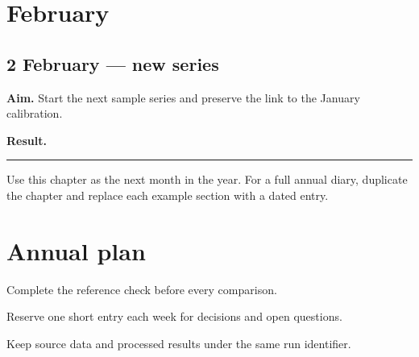 \documentclass[11pt,oneside]{book}
\newcommand{\logday}[2]{\section{#1}\textbf{Aim.} #2\par\textbf{Result.}\hspace{0.5em}\rule{0.7\linewidth}{0.4pt}\par}
\begin{document}
\chapter{February}
\logday{2 February --- new series}{Start the next sample series and preserve the link to the January calibration.}
Use this chapter as the next month in the year. For a full annual diary,
duplicate the chapter and replace each example section with a dated entry.
\appendix
\chapter{Annual plan}
\begin{description}[leftmargin=2.4cm,style=sameline]
\item[Measure] Complete the reference check before every comparison.
\item[Review] Reserve one short entry each week for decisions and open questions.
\item[Archive] Keep source data and processed results under the same run identifier.
\end{description}
\end{document}
